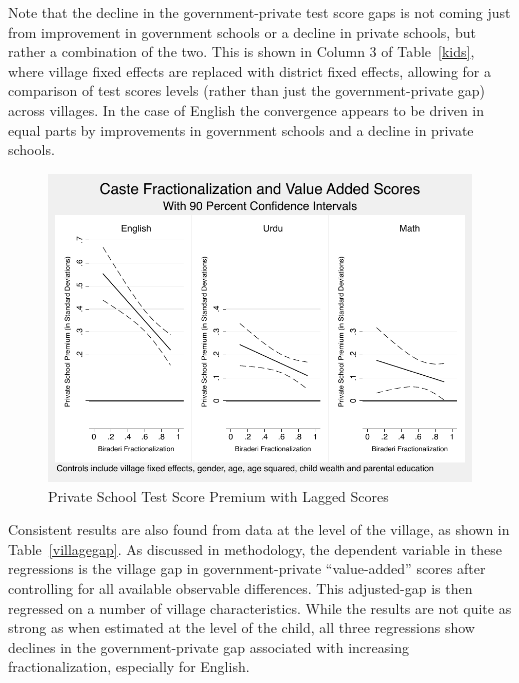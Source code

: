 \documentclass[12pt]{article}
\begin{document}
Note that the decline in the government-private test score gaps is not coming just from improvement in government schools or a decline in private schools, but rather a combination of the two. This is shown in Column 3 of Table~\ref{kids}, where village fixed effects are replaced with district fixed effects, allowing for a comparison of test scores levels (rather than just the government-private gap) across villages. In the case of English the convergence appears to be driven in equal parts by improvements in government schools and a decline in private schools.
\begin{figure}[h]
	\caption{Private School Test Score Premium with Lagged Scores}\label{kidscombined}
	\centering	
	\includegraphics[scale=0.8]{graphs/kids_combined.pdf}
\end{figure}



Consistent results are also found from data at the level of the village, as shown in Table~\ref{villagegap}. As discussed in methodology, the dependent variable in these regressions is the village gap in government-private ``value-added'' scores after controlling for all available observable differences. This adjusted-gap is then regressed on a number of village characteristics. While the results are not quite as strong as when estimated at the level of the child, all three regressions show declines in the government-private gap associated with increasing fractionalization, especially for English. 




\end{document}
